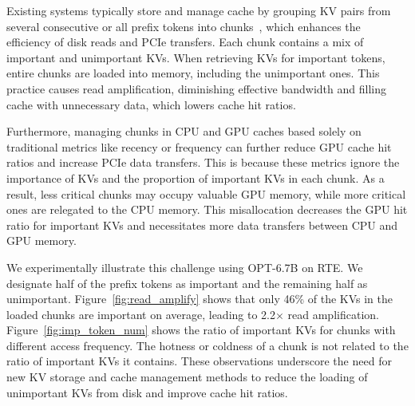 \noindent 
Existing systems typically store and manage cache by grouping KV pairs from
several consecutive or all prefix tokens into
chunks~\cite{chunkattention-arxiv24, sglang-arxiv23, attentionstore-atc24,
hydragen-arxiv24}, which enhances the efficiency of disk reads and PCIe
transfers. 
Each chunk contains a mix of important and unimportant KVs. When retrieving KVs for important tokens, entire chunks are loaded into memory, including the unimportant ones. This practice causes read amplification, diminishing effective bandwidth and filling cache with unnecessary data, which lowers cache hit ratios.

Furthermore, managing chunks in CPU and GPU caches based solely on traditional
metrics like recency or frequency can further reduce GPU cache hit ratios and
increase PCIe data transfers. This is because these metrics ignore the
importance of KVs and the proportion of important KVs in each chunk. As a
result, less critical chunks may occupy valuable GPU memory, while more critical
ones are relegated to the CPU memory. This misallocation decreases the GPU hit ratio
for important KVs and necessitates more data transfers between CPU and GPU memory.


We experimentally illustrate this challenge using OPT-6.7B on RTE. 
We designate half of the prefix tokens as important and the remaining half as unimportant.
Figure~\ref{fig:read_amplify} shows 
that only 46\% of the KVs in the 
loaded chunks are important on average, leading to 2.2$\times$ read amplification. 
Figure~\ref{fig:imp_token_num} shows the ratio of important KVs for chunks with different access 
frequency. The hotness or coldness of a chunk is not related to the 
ratio of important KVs it contains. These observations 
underscore the need for new KV storage and cache management methods to reduce 
the loading of unimportant KVs from disk and improve cache hit ratios.
